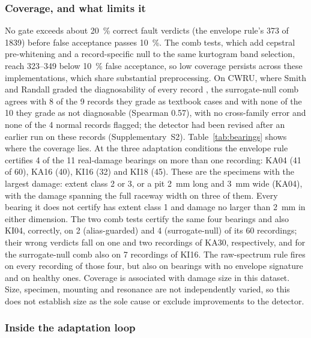 \subsubsection{Coverage, and what limits it}

No gate exceeds about \SI{20}{\percent} correct fault verdicts (the envelope rule's 373
of 1839) before false acceptance passes \SI{10}{\percent}. The comb tests, which add cepstral pre-whitening and a
record-specific null to the same kurtogram band selection, reach 323--349 below \SI{10}{\percent} false acceptance,
so low coverage persists across these implementations, which share substantial preprocessing. On CWRU, where Smith and Randall graded the diagnosability of every record \cite{smith2015}, the surrogate-null comb agrees with 8 of the 9 records they grade as textbook cases and with none of the 10 they grade as not diagnosable (Spearman 0.57), with no cross-family error and none of the 4 normal records flagged; the detector had been revised after an earlier run on these records (Supplementary~S2). Table~\ref{tab:bearings} shows where the coverage lies. At the three adaptation conditions the envelope rule certifies 4 of the
11 real-damage bearings on more than one recording: KA04 (41 of 60), KA16 (40), KI16 (32) and KI18 (45). These are the
specimens with the largest damage: extent class 2 or 3, or a pit \SI{2}{mm} long and \SI{3}{mm} wide (KA04), with the damage
spanning the full raceway width on three of them. Every bearing it does not certify has extent class 1 and damage no larger
than \SI{2}{mm} in either dimension. The two comb tests certify the same four bearings and also KI04, correctly, on 2 (alias-guarded) and
4 (surrogate-null) of its 60 recordings; their wrong verdicts fall on one and two recordings of KA30, respectively, and for
the surrogate-null comb also on 7 recordings of KI16. The raw-spectrum rule fires on every recording of those four, but also on bearings with no envelope signature and on healthy
ones. Coverage is associated with damage size in this dataset. Size, specimen, mounting and resonance are not independently varied, so this does not establish size as the sole cause or exclude improvements to the detector.

\subsubsection{Inside the adaptation loop}

